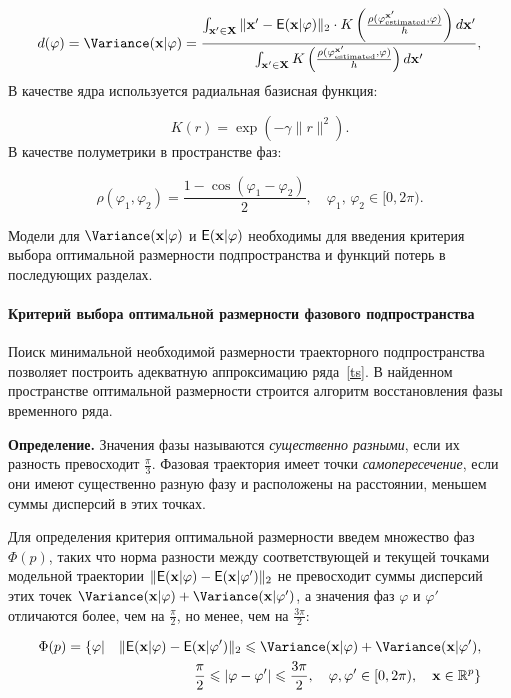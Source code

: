 \documentclass[12pt, twoside]{article}
\theoremstyle{definition}
\begin{document}
\begin{equation}           
    d(\varphi) = \Variance(\mathbf{x}|\varphi) =
        \frac{
        \int_{\mathbf{x'}\in \mathbf{X}}  
        \|\mathbf{x'} - \Expect(\mathbf{x}|\varphi)\|_2
        \cdot
        K\left(\frac{\rho(\varphi^{\mathbf{x'}}_{\text{estimated}}, \varphi)}{h}\right) 
        d\mathbf{x'}
        }
        {\int_{\mathbf{x'}\in \mathbf{X}} K\left(\frac{\rho(\varphi^{\mathbf{x'}}_{\text{estimated}}, \varphi)}{h}\right) d\mathbf{x'}},
\label{eq:NW4} 
\end{equation}
В качестве ядра используется радиальная базисная функция:

\[ K(r)= \exp\left(-\gamma\| r \|^2\right). \]
В качестве полуметрики в пространстве фаз:

    \[ \rho(\varphi_1, \varphi_2) = \frac{1 - \cos(\varphi_1 - \varphi_2)}{2},
    \quad
    \varphi_1,\,\varphi_2 \in [0, 2\pi).\]

Модели для $\Variance(\mathbf{x}|\varphi)$ и $\mathsf{E}(\mathbf{x}|\varphi)$ необходимы для введения критерия выбора оптимальной размерности подпространства и функций потерь в последующих разделах.

\paragraph{Критерий выбора оптимальной размерности фазового подпространства} \label{subsection:4.2}
Поиск минимальной необходимой размерности траекторного подпространства позволяет построить адекватную аппроксимацию ряда~\eqref{ts}. В найденном пространстве оптимальной размерности строится алгоритм восстановления фазы временного ряда.

\textbf{Определение.}
Значения фазы называются \textit{существенно разными}, если их разность превосходит $\frac{\pi}{3}$.
Фазовая траектория имеет точки \textit{самопересечение}, если они имеют  существенно разную фазу и расположены на расстоянии, меньшем суммы дисперсий в этих точках.

Для определения критерия оптимальной размерности введем множество фаз $\Phi(p)$, таких что норма разности между соответствующей и текущей точками модельной траектории $\|\mathsf{E}(\mathbf{x}|\varphi) - \mathsf{E}(\mathbf{x}|\varphi')\|_2$ не превосходит суммы дисперсий этих точек $\Variance(\mathbf{x}|\varphi) + \Variance(\mathbf{x}|\varphi')$, а значения фаз $\varphi$ и $\varphi'$ отличаются более, чем на $\frac{\pi}{2}$, но менее, чем на $\frac{3\pi}{2}$:

\begin{align}           
    \Phi(p) = \{\varphi |
    \quad
    \|\Expect(\mathbf{x}|\varphi) - \Expect(\mathbf{x}|\varphi')\|_2
    \leq
    \Variance(\mathbf{x}|\varphi) + \Variance(\mathbf{x}|\varphi'),
    \nonumber \\
    \frac{\pi}{2} \leq |\varphi - \varphi'| \leq \frac{3\pi}{2},
    \quad
    \varphi,\varphi' \in [0,2\pi),
    \quad
    \mathbf{x} \in \mathbb{R}^p
    \}
\label{eq:intersection} 
\end{align}
\end{document}
